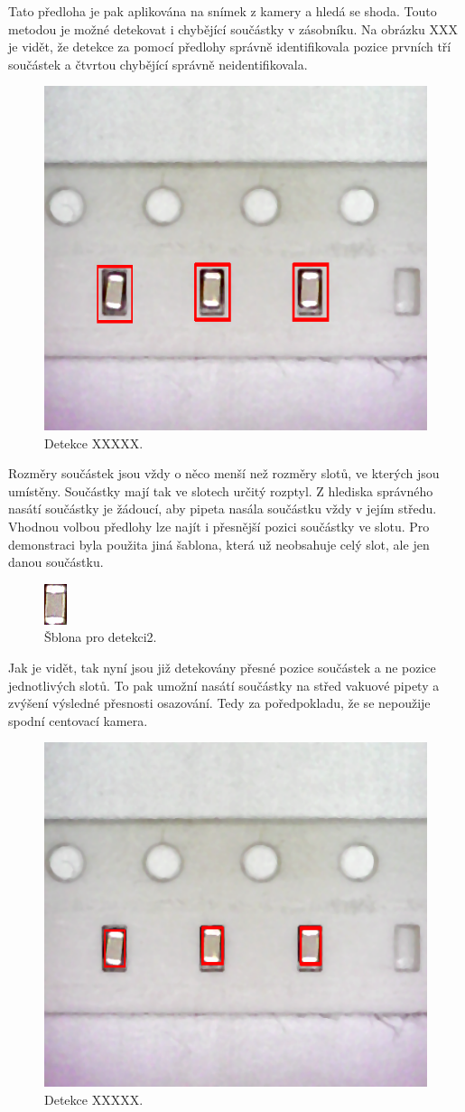 Tato předloha je pak aplikována na snímek z kamery a hledá se shoda. Touto metodou je možné detekovat i chybějící součástky v zásobníku. Na obrázku XXX je vidět, že detekce za pomocí předlohy správně identifikovala pozice prvních tří součástek a čtvrtou chybějící správně neidentifikovala.
\begin{figure}[h!]
  \centering
    \includegraphics[width=0.5\linewidth]{obrazky/res2.png}%
    \caption{Detekce XXXXX.}
    \label{fig:tape3}
\end{figure}


Rozměry součástek jsou vždy o něco menší než rozměry slotů, ve kterých jsou umístěny. Součástky mají tak ve slotech určitý rozptyl. Z hlediska správného nasátí součástky je žádoucí, aby pipeta nasála součástku vždy v jejím středu. Vhodnou volbou předlohy lze najít i přesnější pozici součástky ve slotu.
Pro demonstraci byla použita jiná šablona, která už neobsahuje celý slot, ale jen danou součástku.
\begin{figure}[h!]
  \centering
    \includegraphics[width=0.1\linewidth]{obrazky/template2.png}%
    \caption{Šblona pro detekci2.}
    \label{fig:template2}
\end{figure}

Jak je vidět, tak nyní jsou již detekovány přesné pozice součástek a ne pozice jednotlivých slotů. To pak umožní nasátí součástky na střed vakuové pipety a zvýšení výsledné přesnosti osazování. Tedy za poředpokladu, že se nepoužije spodní centovací kamera. 
\begin{figure}[h!]
  \centering
    \includegraphics[width=0.5\linewidth]{obrazky/res3.png}%
    \caption{Detekce XXXXX.}
    \label{fig:tape4}
\end{figure}

